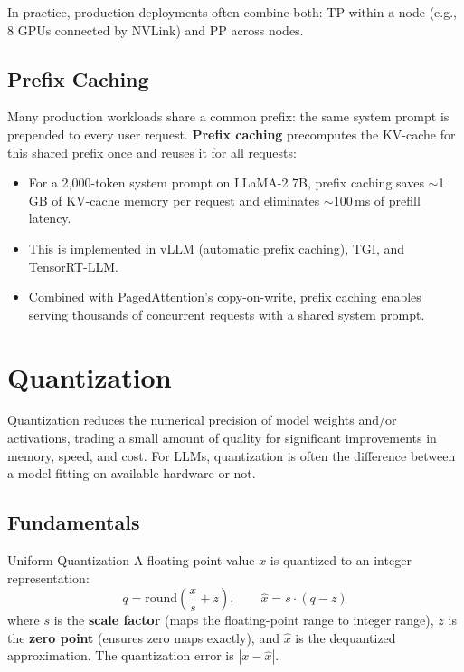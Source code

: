 In practice, production deployments often combine both: TP within a node (e.g., 8 GPUs
connected by NVLink) and PP across nodes.

\subsection{Prefix Caching}
\label{sec:prefix_caching}

Many production workloads share a common prefix: the same system prompt is prepended to
every user request.  \textbf{Prefix caching} precomputes the KV-cache for this shared
prefix once and reuses it for all requests:
\begin{itemize}
    \item For a 2,000-token system prompt on LLaMA-2 7B, prefix caching saves
          $\sim$1\,GB of KV-cache memory per request and eliminates
          $\sim$100\,ms of prefill latency.
    \item This is implemented in vLLM (automatic prefix caching), TGI, and
          TensorRT-LLM.
    \item Combined with PagedAttention's copy-on-write, prefix caching enables
          serving thousands of concurrent requests with a shared system prompt.
\end{itemize}


\section{Quantization}
\label{sec:quantization}

Quantization reduces the numerical precision of model weights and/or activations,
trading a small amount of quality for significant improvements in memory, speed, and cost.
For LLMs, quantization is often the difference between a model fitting on available
hardware or not.

\subsection{Fundamentals}

\begin{mathresult}{Uniform Quantization}
A floating-point value $x$ is quantized to an integer representation:
\[
    q = \text{round}\!\left(\frac{x}{s} + z\right), \qquad
    \hat{x} = s \cdot (q - z)
\]
where $s$ is the \textbf{scale factor} (maps the floating-point range to integer range),
$z$ is the \textbf{zero point} (ensures zero maps exactly), and $\hat{x}$ is the
dequantized approximation.  The quantization error is $|x - \hat{x}|$.
\end{mathresult}

